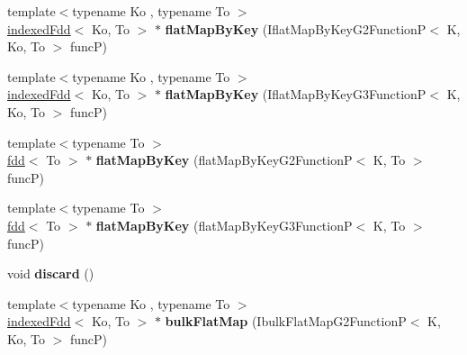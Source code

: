 \begin{DoxyCompactItemize}
\item 
\hypertarget{classfaster_1_1groupedFdd_a7189b8f22a6b6aa82d826242e0c085e2}{}{\footnotesize template$<$typename Ko , typename To $>$ }\\\hyperlink{classfaster_1_1indexedFdd}{indexed\+Fdd}$<$ Ko, To $>$ $\ast$ {\bfseries flat\+Map\+By\+Key} (Iflat\+Map\+By\+Key\+G2\+Function\+P$<$ K, Ko, To $>$ func\+P)\label{classfaster_1_1groupedFdd_a7189b8f22a6b6aa82d826242e0c085e2}

\item 
\hypertarget{classfaster_1_1groupedFdd_a30a78832f8adb812a4cf8e066a810694}{}{\footnotesize template$<$typename Ko , typename To $>$ }\\\hyperlink{classfaster_1_1indexedFdd}{indexed\+Fdd}$<$ Ko, To $>$ $\ast$ {\bfseries flat\+Map\+By\+Key} (Iflat\+Map\+By\+Key\+G3\+Function\+P$<$ K, Ko, To $>$ func\+P)\label{classfaster_1_1groupedFdd_a30a78832f8adb812a4cf8e066a810694}

\item 
\hypertarget{classfaster_1_1groupedFdd_ac04b3eda45e06a5d8ebaec16fd3e7df2}{}{\footnotesize template$<$typename To $>$ }\\\hyperlink{classfaster_1_1fdd}{fdd}$<$ To $>$ $\ast$ {\bfseries flat\+Map\+By\+Key} (flat\+Map\+By\+Key\+G2\+Function\+P$<$ K, To $>$ func\+P)\label{classfaster_1_1groupedFdd_ac04b3eda45e06a5d8ebaec16fd3e7df2}

\item 
\hypertarget{classfaster_1_1groupedFdd_ace8e2aba0c083f8f2c0ac1a949521edf}{}{\footnotesize template$<$typename To $>$ }\\\hyperlink{classfaster_1_1fdd}{fdd}$<$ To $>$ $\ast$ {\bfseries flat\+Map\+By\+Key} (flat\+Map\+By\+Key\+G3\+Function\+P$<$ K, To $>$ func\+P)\label{classfaster_1_1groupedFdd_ace8e2aba0c083f8f2c0ac1a949521edf}

\item 
\hypertarget{classfaster_1_1groupedFdd_abfbee9b73e344e5fd6f44a209f6c1762}{}void {\bfseries discard} ()\label{classfaster_1_1groupedFdd_abfbee9b73e344e5fd6f44a209f6c1762}

\item 
\hypertarget{classfaster_1_1groupedFdd_ad1fb70f835dd2e1fa59c2e5e616b545a}{}{\footnotesize template$<$typename Ko , typename To $>$ }\\\hyperlink{classfaster_1_1indexedFdd}{indexed\+Fdd}$<$ Ko, To $>$ $\ast$ {\bfseries bulk\+Flat\+Map} (Ibulk\+Flat\+Map\+G2\+Function\+P$<$ K, Ko, To $>$ func\+P)\label{classfaster_1_1groupedFdd_ad1fb70f835dd2e1fa59c2e5e616b545a}


\end{DoxyCompactItemize}
